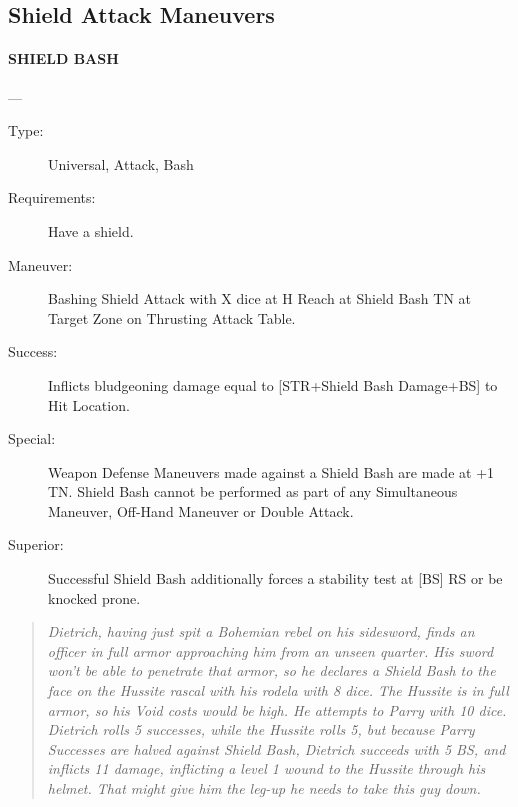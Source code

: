 \documentclass[oneside,11pt,english]{book}
\begin{document}
\subsection{Shield Attack Maneuvers}
\paragraph{\large\label{man:SHIELD BASH} SHIELD BASH}---\quad{\large[X]}
\vspace{-10pt}\begin{description} 
\item [Type:] Universal, Attack, Bash 
\item [Requirements:] Have a shield. 
\item [Maneuver:] Bashing Shield Attack with X dice at H Reach at Shield Bash TN at Target Zone on 
Thrusting Attack Table. 
\item [Success:] Inflicts bludgeoning damage equal to [STR+Shield Bash Damage+BS] to Hit Location. 
\item [Special:] Weapon Defense Maneuvers made against a Shield Bash are made at +1 TN. Shield Bash cannot 
be performed as part of any Simultaneous Maneuver, Off-Hand Maneuver or Double Attack. 
\item [Superior:] Successful Shield Bash additionally forces a stability test at [BS] RS or be knocked prone. 
\end{description}
\begin{quotation}
\emph{Dietrich, having just spit a Bohemian rebel on his sidesword, finds an officer in full armor approaching him from an unseen 
quarter. His sword won’t be able to penetrate that armor, so he declares a Shield Bash to the face on the Hussite rascal with his 
rodela with 8 dice. The Hussite is in full armor, so his Void costs would be high. He attempts to Parry with 10 dice. Dietrich 
rolls 5 successes, while the Hussite rolls 5, but because Parry Successes are halved against Shield Bash, Dietrich succeeds with 5 
BS, and inflicts 11 damage, inflicting a level 1 wound to the Hussite through his helmet. That might give him the leg-up he needs 
to take this guy down.}
\end{quotation}
\end{document}
